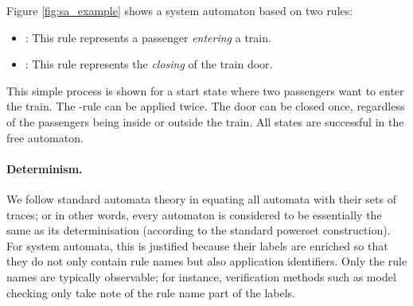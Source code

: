 \begin{example}\label{ex:sa}
Figure \ref{fig:sa_example} shows a system automaton based on two rules:
\begin{itemize}
\item[\propagate]: This rule represents a passenger \emph{entering} a train.
\item[\dispatch]: This rule represents the \emph{closing} of the train door.
\end{itemize}
%
This simple process is shown for a start state where two passengers want to
enter the train. The \propagate-rule can be applied twice. The door can be
closed once, regardless of the passengers being inside or outside the train.
All states are successful in the free automaton.
\end{example}

\paragraph{Determinism.}

We follow standard automata theory in equating all automata with their sets of
traces; or in other words, every automaton is considered to be essentially the
same as its determinisation (according to the standard powerset construction).
For system automata, this is justified because their labels are enriched so
that they do not only contain rule names but also application identifiers.
Only the rule names are typically observable; for instance, verification
methods such as model checking only take note of the rule name part of the
labels.

